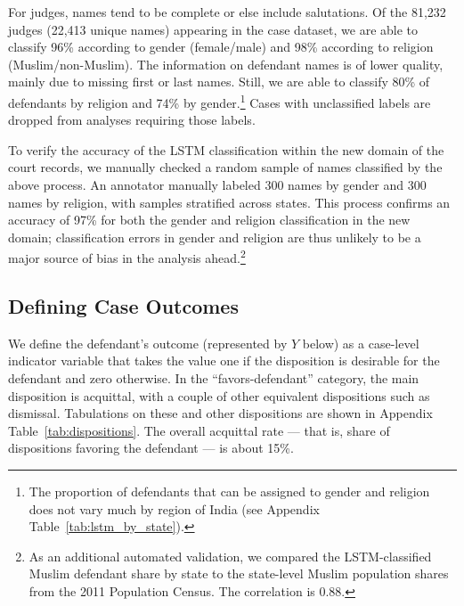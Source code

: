 \documentclass[12pt,english]{article}
\begin{document}
For judges, names tend to be complete or else include salutations. Of the 81,232 judges (22,413 unique names) appearing in the case dataset, we are able to classify 96\% according to gender (female/male) and 98\% according to religion (Muslim/non-Muslim). The information on defendant names is of lower quality, mainly due to missing first or last names. Still, we are able to classify 80\% of defendants by religion and 74\% by gender.\footnote{The proportion of defendants that can be assigned to gender and religion does not vary much by region of India (see Appendix Table~\ref{tab:lstm_by_state}).} Cases with unclassified labels are dropped from analyses requiring those labels.

To verify the accuracy of the LSTM classification within the new domain of the court records, we manually checked a random sample of names classified by the above process. An annotator manually labeled 300 names by gender and 300 names by religion, with samples stratified across states. This process confirms an accuracy of 97\% for both the gender and religion classification in the new domain; classification errors in gender and religion are thus unlikely to be a major source of bias in the analysis ahead.\footnote{As an additional automated validation, we compared the LSTM-classified Muslim defendant share by state to the state-level Muslim population shares from the 2011 Population Census. The correlation is 0.88.}

\subsection{Defining Case Outcomes}

We define the defendant's outcome (represented by $Y$ below) as a case-level indicator variable that takes the value one if the disposition is desirable for the defendant and zero otherwise. In the ``favors-defendant'' category, the main disposition is acquittal, with a couple of other equivalent dispositions such as dismissal. Tabulations on these and other dispositions are shown in Appendix Table~\ref{tab:dispositions}. The overall acquittal rate --- that is, share of dispositions favoring the defendant --- is about 15\%.
\end{document}
